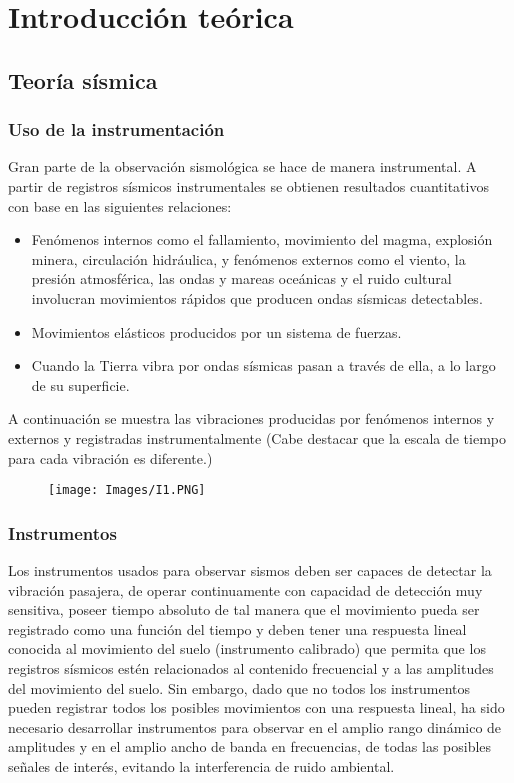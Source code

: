 \documentclass[12pt]{article}
\begin{document}
	\tableofcontents
	\newpage
	\section{Introducción teórica}
	    \subsection{Teoría sísmica}
	        \subsubsection{Uso de la instrumentación}
	         Gran parte de la observación sismológica se hace de manera instrumental. A partir de registros sísmicos instrumentales se obtienen resultados cuantitativos con base en las siguientes relaciones:
	       \begin{itemize}
	           \item Fenómenos internos como el fallamiento, movimiento del magma, explosión minera, circulación hidráulica, y fenómenos externos como el viento, la presión atmosférica, las ondas y mareas oceánicas y el ruido cultural involucran movimientos rápidos que producen ondas sísmicas detectables.
	           \item Movimientos elásticos producidos por un sistema de fuerzas.
	           \item Cuando la Tierra vibra por ondas sísmicas pasan a través de ella, a lo largo de su superficie.
	       \end{itemize}
	       A continuación se muestra las vibraciones producidas por fenómenos internos y externos y registradas instrumentalmente (Cabe destacar que la escala de tiempo para cada vibración es diferente.) 
	       \begin{figure}[H]
    	       \centering
    	        \texttt{[image: Images/I1.PNG]}
    	   \end{figure}
    	    
    	    \subsubsection{Instrumentos}
    	    Los instrumentos usados para observar sismos deben ser capaces de detectar la vibración pasajera, de operar continuamente con capacidad de detección muy sensitiva, poseer tiempo absoluto de tal manera que el movimiento pueda ser registrado como una función del tiempo y deben tener una respuesta lineal conocida al movimiento del suelo (instrumento calibrado) que permita que los registros sísmicos estén relacionados al contenido frecuencial y a las amplitudes del movimiento del suelo. Sin embargo, dado que no todos los instrumentos pueden registrar todos los posibles movimientos con una respuesta lineal, ha sido necesario desarrollar instrumentos para observar en el amplio rango dinámico de amplitudes y en el amplio ancho de banda en frecuencias, de todas las posibles señales de interés, evitando la interferencia de ruido ambiental.
    	    
\end{document}
